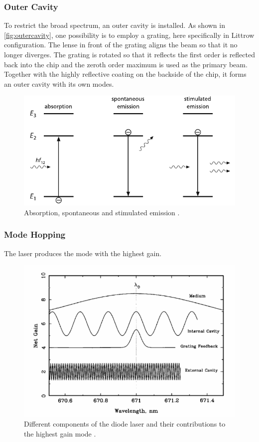 \subsubsection{Outer Cavity}
To restrict the broad spectrum, an outer cavity is installed.
As shown in \autoref{fig:outercavity}, one possibility is to employ a grating, here specifically in Littrow configuration.
The lense in front of the grating aligns the beam so that it no longer diverges.
The grating is rotated so that it reflects the first order is reflected back into the chip and the zeroth order maximum is used as the primary beam.
Together with the highly reflective coating on the backside of the chip, it forms an outer cavity with its own modes.

\begin{figure}[H]
    \centering
    \includegraphics{figures/emission.pdf}
    \caption{Absorption, spontaneous and stimulated emission \cite{teachspin}.}
    \label{fig:emission}
\end{figure}

\subsubsection{Mode Hopping}

The laser produces the mode with the highest gain.

\begin{figure}[H]
    \centering
    \includegraphics{figures/gain.pdf}
    \caption{Different components of the diode laser and their contributions to the highest gain mode \cite{teachspin}.}
    \label{fig:gain}
\end{figure}

